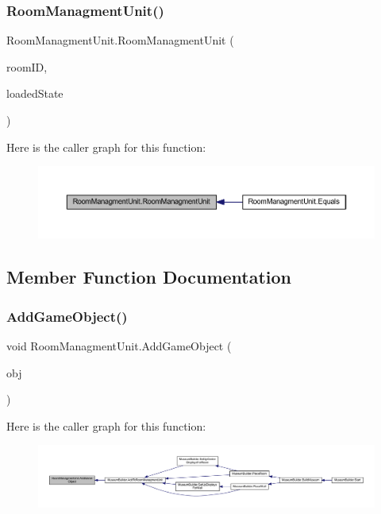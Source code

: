 \subsubsection{\texorpdfstring{Room\+Managment\+Unit()}{RoomManagmentUnit()}}
{\footnotesize\ttfamily Room\+Managment\+Unit.\+Room\+Managment\+Unit (\begin{DoxyParamCaption}\item[{uint}]{room\+ID,  }\item[{bool}]{loaded\+State }\end{DoxyParamCaption})}

Here is the caller graph for this function\+:\nopagebreak
\begin{figure}[H]
\begin{center}
\leavevmode
\includegraphics[width=350pt]{class_room_managment_unit_ad9c4cf6c496f32f6e0edbe47a4bf0295_icgraph}
\end{center}
\end{figure}


\subsection{Member Function Documentation}
\mbox{\label{class_room_managment_unit_ac7f3f62eb0e6f9f0bb239266796a323a}} 
\subsubsection{\texorpdfstring{Add\+Game\+Object()}{AddGameObject()}}
{\footnotesize\ttfamily void Room\+Managment\+Unit.\+Add\+Game\+Object (\begin{DoxyParamCaption}\item[{Game\+Object}]{obj }\end{DoxyParamCaption})}

Here is the caller graph for this function\+:
\nopagebreak
\begin{figure}[H]
\begin{center}
\leavevmode
\includegraphics[width=350pt]{class_room_managment_unit_ac7f3f62eb0e6f9f0bb239266796a323a_icgraph}
\end{center}
\end{figure}
\mbox{\label{class_room_managment_unit_a663946fa33bad407b32d75aea8e7d5d9}} 
